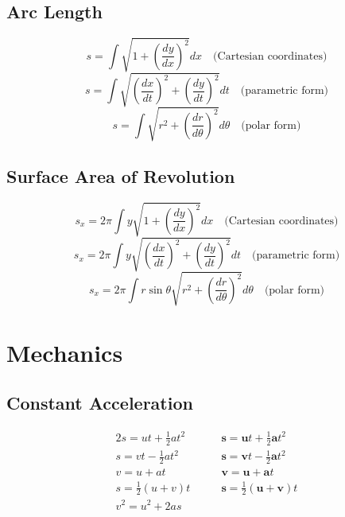     \subsection{Arc Length}
    \begin{equation}
        s=\int\sqrt{1+\left(\frac{dy}{dx}\right)^2}dx\quad\text{(Cartesian coordinates)}
    \end{equation}
    \begin{equation}
        s=\int\sqrt{\left(\frac{dx}{dt}\right)^2+\left(\frac{dy}{dt}\right)^2}dt\quad\text{(parametric form)}
    \end{equation}
    \begin{equation}
        s=\int\sqrt{r^2+\left(\frac{dr}{d\theta}\right)^2}d\theta\quad\text{(polar form)}
    \end{equation}

    \subsection{Surface Area of Revolution}
    \begin{equation}
        s_x=2\pi\int y\sqrt{1+\left(\frac{dy}{dx}\right)^2}dx\quad\text{(Cartesian coordinates)}
    \end{equation}
    \begin{equation}
        s_x=2\pi\int y\sqrt{\left(\frac{dx}{dt}\right)^2+\left(\frac{dy}{dt}\right)^2}dt\quad\text{(parametric form)}
    \end{equation}
    \begin{equation}
        s_x=2\pi\int r\sin\theta\sqrt{r^2+\left(\frac{dr}{d\theta}\right)^2}d\theta\quad\text{(polar form)}
    \end{equation}

    \section{Mechanics}
    \subsection{Constant Acceleration}
    \begin{alignat}{2}
        s=ut+\frac{1}{2}at^2&\qquad\textbf{s}=\textbf{u}t+\frac{1}{2}\textbf{a}t^2 \\
        s=vt-\frac{1}{2}at^2&\qquad\textbf{s}=\textbf{v}t-\frac{1}{2}\textbf{a}t^2 \\
        v=u+at&\qquad\textbf{v}=\textbf{u}+\textbf{a}t \\
        s=\frac{1}{2}(u+v)t&\qquad\textbf{s}=\frac{1}{2}(\textbf{u}+\textbf{v})t \\
        v^2=u^2+2as&
    \end{alignat}

